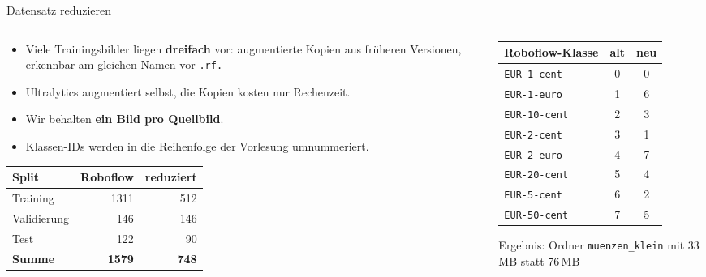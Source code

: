 \begin{frame}{Datensatz reduzieren}
\footnotesize
\begin{columns}
\begin{column}{0.53\textwidth}
\begin{itemize}
  \item Viele Trainingsbilder liegen \textbf{dreifach} vor: augmentierte Kopien aus früheren Versionen, erkennbar am gleichen Namen vor \texttt{.rf.}
  \item Ultralytics augmentiert selbst, die Kopien kosten nur Rechenzeit.
  \item Wir behalten \textbf{ein Bild pro Quellbild}.
  \item Klassen-IDs werden in die Reihenfolge der Vorlesung umnummeriert.
\end{itemize}
\vspace{0.5em}
\centering
\begin{tabular}{lrr}
\toprule
\textbf{Split} & \textbf{Roboflow} & \textbf{reduziert} \\
\midrule
Training & 1311 & 512 \\
Validierung & 146 & 146 \\
Test & 122 & 90 \\
\midrule
\textbf{Summe} & \textbf{1579} & \textbf{748} \\
\bottomrule
\end{tabular}
\end{column}
\begin{column}{0.48\textwidth}
\centering
\begin{tabular}{lcc}
\toprule
\textbf{Roboflow-Klasse} & \textbf{alt} & \textbf{neu} \\
\midrule
\texttt{EUR-1-cent} & 0 & 0 \\
\texttt{EUR-1-euro} & 1 & 6 \\
\texttt{EUR-10-cent} & 2 & 3 \\
\texttt{EUR-2-cent} & 3 & 1 \\
\texttt{EUR-2-euro} & 4 & 7 \\
\texttt{EUR-20-cent} & 5 & 4 \\
\texttt{EUR-5-cent} & 6 & 2 \\
\texttt{EUR-50-cent} & 7 & 5 \\
\bottomrule
\end{tabular}

\vspace{0.5em}
Ergebnis: Ordner \texttt{muenzen\_klein} mit 33\,MB statt 76\,MB
\end{column}
\end{columns}
\end{frame}

